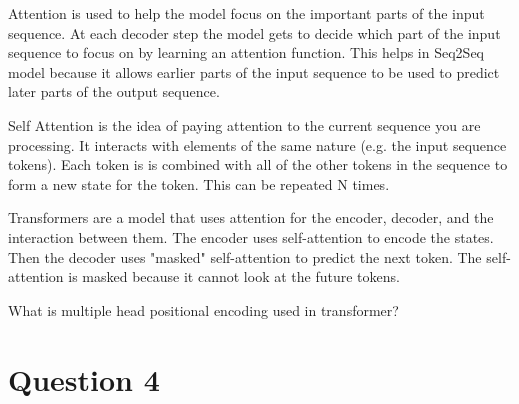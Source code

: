 \documentclass{article}
\begin{document}
Attention is used to help the model focus on the important parts of the input sequence. At each decoder step the model gets to decide which part of the input sequence to focus on by learning an attention function. This helps in Seq2Seq model because it allows earlier parts of the input sequence to be used to predict later parts of the output sequence.


Self Attention is the idea of paying attention to the current sequence you are processing. It interacts with elements of the same nature (e.g. the input sequence tokens). Each token is is combined with all of the other tokens in the sequence to form a new state for the token. This can be repeated N times.   


Transformers are a model that uses attention for the encoder, decoder, and the interaction between them. The encoder uses self-attention to encode the states. Then the decoder uses "masked" self-attention to predict the next token. The self-attention is masked because it cannot look at the future tokens. 


What is multiple head positional encoding used in transformer? 



\section{Question 4}
\end{document}
